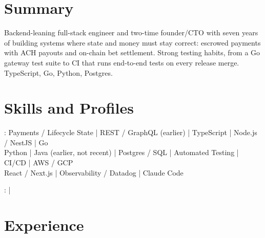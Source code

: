 \documentclass[print]{jack-resume}
\begin{document}
\pagecolor{darkmodeBackground}


\begin{minipage}[t][1cm][t]{.03\textwidth}
    \hfill
\end{minipage}

\section{Summary}
Backend-leaning full-stack engineer and two-time founder/CTO with seven years of building systems where state and money must stay correct: escrowed payments with ACH payouts and on-chain bet settlement. Strong testing habits, from a Go gateway test suite to CI that runs end-to-end tests on every release merge. TypeScript, Go, Python, Postgres.
\sectionsep

\section{Skills and Profiles}
:
Payments / Lifecycle State \hfill | \hfill
REST / GraphQL (earlier) \hfill | \hfill
TypeScript \hfill | \hfill
Node.js / NestJS \hfill | \hfill
Go \\
\hspace{1.0cm} Python \hfill | \hfill
Java (earlier, not recent) \hfill | \hfill
Postgres / SQL \hfill | \hfill
Automated Testing \hfill | \hfill
CI/CD \hfill | \hfill
AWS / GCP \\
\hspace{1.0cm} React / Next.js \hfill | \hfill
Observability / Datadog \hfill | \hfill
Claude Code \\

\raggedright{
    :
      \href{https://www.linkedin.com/in/jack-sturtevant/}{ \ExternalLink} |
     \href{https://github.com/jacksturt}{ \ExternalLink}}

\section{Experience}
\end{document}

